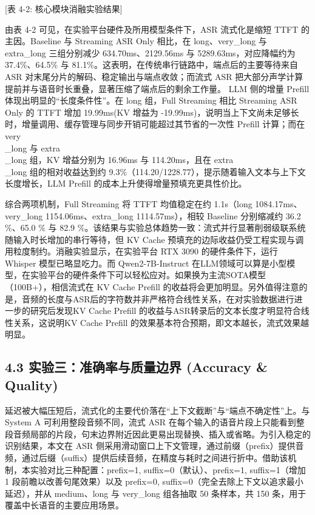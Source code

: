 \documentclass[UTF8,a4paper,12pt]{ctexart}
\begin{document}
[表 4-2: 核心模块消融实验结果]

由表 4-2 可见，在实验平台硬件及所用模型条件下，ASR 流式化是缩短 TTFT 的主因。Baseline 与 Streaming ASR Only 相比，在 long、very\_long 与 extra\_long 三组分别减少 634.70ms、2129.56ms 与 5289.63ms，对应降幅约为 37.4\%、64.5\% 与 81.1\%。这表明，在传统串行链路中，端点后的主要等待来自 ASR 对末尾分片的解码、稳定输出与端点收敛；而流式 ASR 把大部分声学计算提前并与语音时长重叠，显著压缩了端点后的剩余工作量。 LLM 侧的增量 Prefill 体现出明显的“长度条件性”。在 long 组，Full Streaming 相比 Streaming ASR Only 的 TTFT 增加 19.99ms(KV 增益为 -19.99ms)，说明当上下文尚未足够长时，增量调用、缓存管理与同步开销可能超过其节省的一次性 Prefill 计算；而在 very\\_long 与 extra\\_long 组，KV 增益分别为 16.96ms 与 114.20ms，且在 extra\\_long 组的相对收益达到约 9.3\%（114.20/1228.77），提示随着输入文本与上下文长度增长，LLM Prefill 的成本上升使得增量预填充更具性价比。  

综合两项机制，Full Streaming 将 TTFT 均值稳定在约 1.1s（long 1084.17ms、very\_long 1154.06ms、extra\_long 1114.57ms），相较 Baseline 分别缩减约 36.2 \%、65.0 \% 与 82.9 \%。该结果与实验总体趋势一致：流式并行显著削弱级联系统随输入时长增加的串行等待，但 KV Cache 预填充的边际收益仍受工程实现与调用粒度制约。消融实验显示，在实验平台 RTX 3090 的硬件条件下，运行 Whisper 模型已略显吃力。而 Qwen2-7B-Instruct 在LLM领域可以算是小型模型，在实验平台的硬件条件下可以轻松应对。如果换为主流SOTA模型（100B+），相信流式在 KV Cache Prefill 的收益将会更加明显。另外值得注意的是，音频的长度与ASR后的字符数并非严格符合线性关系，在对实验数据进行进一步的研究后发现KV Cache Prefill 的收益与ASR转录后的文本长度才明显符合线性关系，这说明KV Cache Prefill 的效果基本符合预期，即文本越长，流式效果越明显。

\subsection*{4.3 实验三：准确率与质量边界 (Accuracy \& Quality)}


延迟被大幅压短后，流式化的主要代价落在“上下文截断”与“端点不确定性”上。与 System A 可利用整段音频不同，流式 ASR 在每个输入的语音片段上只能看到整段音频局部的片段，句末边界附近因此更易出现替换、插入或省略。为引入稳定的识别结果，本文在 ASR 侧采用滑动窗口上下文管理，通过前缀（prefix）提供音频，通过后缀（suffix）提供后续音频，在精度与耗时之间进行折中。借助该机制，本实验对比三种配置：prefix=1, suffix=0（默认）、prefix=1, suffix=1（增加 1 段前瞻以改善句尾效果）以及 prefix=0, suffix=0（完全去除上下文以追求最小延迟），并从 medium、long 与 very\_long 组各抽取 50 条样本，共 150 条，用于覆盖中长语音的主要应用场景。  
\end{document}
